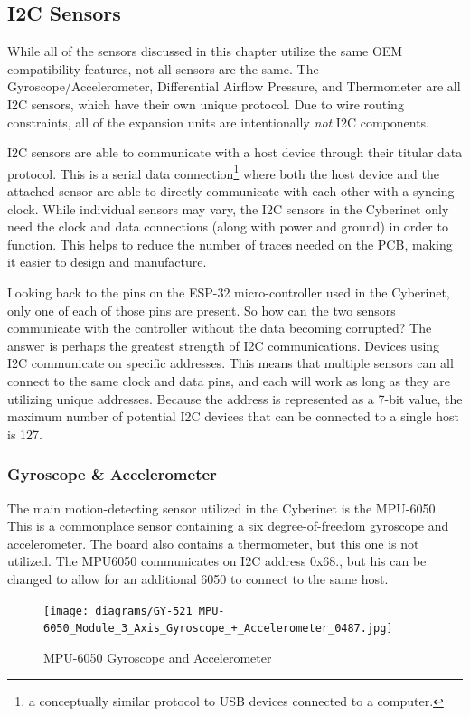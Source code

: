 \subsection{I2C Sensors}
While all of the sensors discussed in this chapter utilize the same OEM compatibility features, not all sensors are the same. The Gyroscope/Accelerometer, Differential Airflow Pressure, and Thermometer are all I2C sensors, which have their own unique protocol. Due to wire routing constraints, all of the expansion units are intentionally \emph{not} I2C components.

I2C sensors are able to communicate with a host device through their titular data protocol. This is a serial data connection\footnote{a conceptually similar protocol to USB devices connected to a computer.} where both the host device and the attached sensor are able to directly communicate with each other with a syncing clock. While individual sensors may vary, the I2C sensors in the Cyberinet only need the clock and data connections (along with power and ground) in order to function. This helps to reduce the number of traces needed on the PCB, making it easier to design and manufacture.

Looking back to the pins on the ESP-32 micro-controller used in the Cyberinet, only one of each of those pins are present. So how can the two sensors communicate with the controller without the data becoming corrupted? The answer is perhaps the greatest strength of I2C communications. Devices using I2C communicate on specific addresses. This means that multiple sensors can all connect to the same clock and data pins, and each will work as long as they are utilizing unique addresses. Because the address is represented as a 7-bit value, the maximum number of potential I2C devices that can be connected to a single host is 127.


\subsubsection{Gyroscope \& Accelerometer}

The main motion-detecting sensor utilized in the Cyberinet is the MPU-6050. This is a commonplace sensor containing a six degree-of-freedom gyroscope and accelerometer. The board also contains a thermometer, but this one is not utilized. The MPU6050 communicates on I2C address 0x68., but his can be changed to allow for an additional 6050 to connect to the same host.

\begin{center}
    \begin{figure}
        \centering
        \texttt{[image: diagrams/GY-521\_MPU-6050\_Module\_3\_Axis\_Gyroscope\_+\_Accelerometer\_0487.jpg]}
        \caption{MPU-6050 Gyroscope and Accelerometer}
        \label{fig:6050}
    \end{figure}
\end{center}


